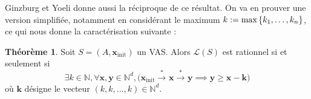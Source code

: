 \documentclass[a4paper,final]{article}
\theoremstyle{definition}
\newtheorem{Theorem}{Théorème}
\let\geq\geqslant
\newcommand{\os}[1]{\left\{\mathinner{#1}\right\}}
\newcommand{\N}{\ensuremath{\mathbb{N}}}
\newcommand{\lang}{\ensuremath{\mathcal{L}}}
\newcommand{\conf}{\ensuremath{\mathcal{R}}}
\newcommand{\trans}[2]{\ensuremath{\stackrel{#1}{\longrightarrow}_{#2}}}
\newcommand{\vect}[1]{\ensuremath{\mathbf{#1}}}
\newcommand{\xinit}{\ensuremath{\vect{x}_\text{init}}}
\newcommand{\valeur}[1]{\ensuremath{\overline{#1}}}
\begin{document}
Ginzburg et Yoeli donne aussi la réciproque de ce résultat.
On va en prouver une version simplifiée, notamment en considérant le maximum $k:= \text{max}\os{k_1,\dots,k_n}$, ce qui nous donne la caractérisation suivante :




\begin{Theorem}
    Soit $S=(A,\xinit)$ un VAS.
    Alors $\lang(S)$ est rationnel si et seulement si
    \begin{equation}
        \exists k\in\N, \forall \vect{x},\vect{y}\in\N^d, 
\big( \xinit\trans{*}{} \vect{x} \trans{*}{} \vect{y}\implies
\vect{y}\geq \vect{x} -\vect{k} \big)
    \label{eq:caracterisation}
    \end{equation}
    où $\vect{k}$ désigne le vecteur $(k,k,...,k)\in\N^d$.
\end{Theorem}
\end{document}
